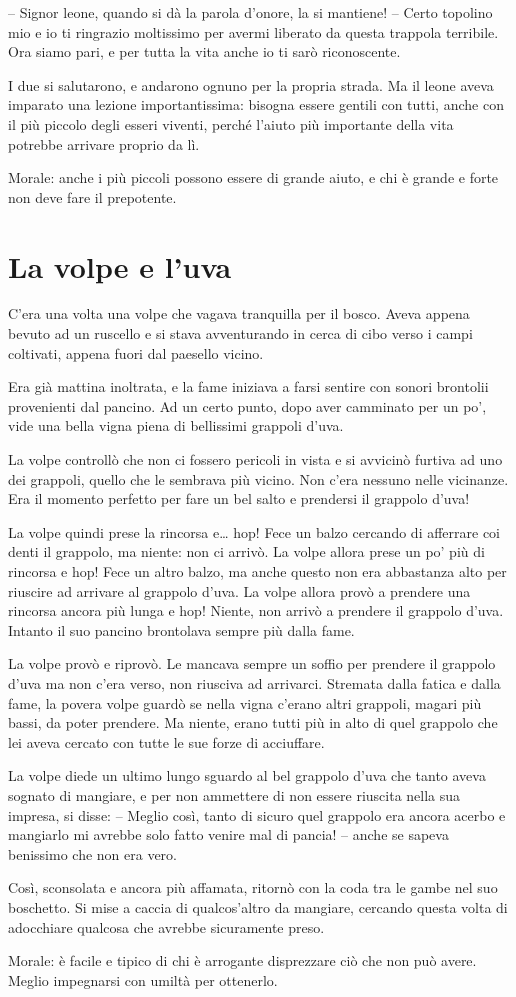 \documentclass[12pt, a4paper]{article}
\begin{document}
– Signor leone, quando si dà la parola d’onore, la si mantiene!
– Certo topolino mio e io ti ringrazio moltissimo per avermi liberato da questa trappola terribile. Ora siamo pari, e per tutta la vita anche io ti sarò riconoscente.

I due si salutarono, e andarono ognuno per la propria strada.
Ma il leone aveva imparato una lezione importantissima: bisogna essere gentili con tutti, anche con il più piccolo degli esseri viventi, perché l’aiuto più importante della vita potrebbe arrivare proprio da lì.

Morale: anche i più piccoli possono essere di grande aiuto, e chi è grande e forte non deve fare il prepotente.
\section*{La volpe e l’uva}
C’era una volta una volpe che vagava tranquilla per il bosco. Aveva appena bevuto ad un ruscello e si stava avventurando in cerca di cibo verso i campi coltivati, appena fuori dal paesello vicino.

Era già mattina inoltrata, e la fame iniziava a farsi sentire con sonori brontolii provenienti dal pancino.
Ad un certo punto, dopo aver camminato per un po’, vide una bella vigna piena di bellissimi grappoli d’uva.

La volpe controllò che non ci fossero pericoli in vista e si avvicinò furtiva ad uno dei grappoli, quello che le sembrava più vicino.
Non c’era nessuno nelle vicinanze. Era il momento perfetto per fare un bel salto e prendersi il grappolo d’uva!

La volpe quindi prese la rincorsa e… hop! Fece un balzo cercando di afferrare coi denti il grappolo, ma niente: non ci arrivò.
La volpe allora prese un po’ più di rincorsa e hop! Fece un altro balzo, ma anche questo non era abbastanza alto per riuscire ad arrivare al grappolo d’uva.
La volpe allora provò a prendere una rincorsa ancora più lunga e hop! Niente, non arrivò a prendere il grappolo d’uva.
Intanto il suo pancino brontolava sempre più dalla fame.

La volpe provò e riprovò. Le mancava sempre un soffio per prendere il grappolo d’uva ma non c’era verso, non riusciva ad arrivarci.
Stremata dalla fatica e dalla fame, la povera volpe guardò se nella vigna c’erano altri grappoli, magari più bassi, da poter prendere. Ma niente, erano tutti più in alto di quel grappolo che lei aveva cercato con tutte le sue forze di acciuffare.

La volpe diede un ultimo lungo sguardo al bel grappolo d’uva che tanto aveva sognato di mangiare, e per non ammettere di non essere riuscita nella sua impresa, si disse:
– Meglio così, tanto di sicuro quel grappolo era ancora acerbo e mangiarlo mi avrebbe solo fatto venire mal di pancia! – anche se sapeva benissimo che non era vero.

Così, sconsolata e ancora più affamata, ritornò con la coda tra le gambe nel suo boschetto. Si mise a caccia di qualcos’altro da mangiare, cercando questa volta di adocchiare qualcosa che avrebbe sicuramente preso.

Morale: è facile e tipico di chi è arrogante disprezzare ciò che non può avere. Meglio impegnarsi con umiltà per ottenerlo.
\end{document}
